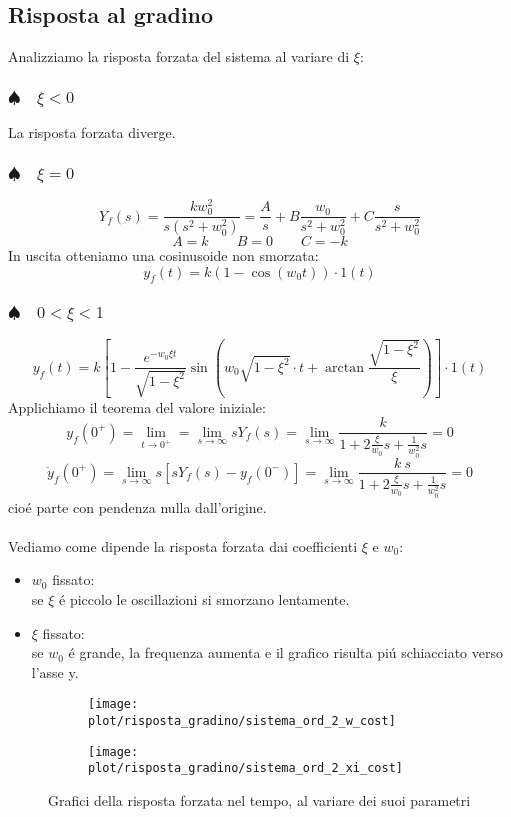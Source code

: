 \documentclass[../main.tex]{subfiles}
\begin{document}
	\subsection{Risposta al gradino}
	Analizziamo la risposta forzata del sistema al variare di $ \xi $:
	\subsubsection{$ \spadesuit \quad \xi < 0 $}
	La risposta forzata diverge.
	\subsubsection{$ \spadesuit \quad \xi = 0 $}
	\[ Y_f(s) = \frac{kw_0^2}{s(s^2+w_0^2)} = \frac{A}{s} + B\frac{w_0}{s^2+w_0^2} + C\frac{s}{s^2+w_0^2} \]
	\[ A = k \qquad B = 0 \qquad C = -k \]
	In uscita otteniamo una cosinusoide non smorzata:
	\[ y_f(t) = k(1-\cos(w_0t)) \cdot 1(t) \]
	\subsubsection{$ \spadesuit \quad 0 < \xi < 1 $}
	\[ y_f(t) = k \left[ 1 - \frac{e^{-w_0\xi t}}{\sqrt{1-\xi^2}} \sin\left( w_0 \sqrt{1-\xi^2} \cdot t + \arctan \frac{\sqrt{1-\xi^2}}{\xi} \right) \right] \cdot 1(t) \]
	Applichiamo il teorema del valore iniziale:
	\[ y_f(0^+) = \lim_{t \to 0^+} = \lim_{s \to \infty} s Y_f(s) = \lim_{s \to \infty} \frac{k}{1+2\frac{\xi}{w_0}s+\frac{1}{w_0^2}s} = 0 \]
	\[ \dot y_f(0^+) = \lim_{s \to \infty} s \left[ sY_f(s) - y_f(0^-) \right] = \lim_{s \to \infty} \frac{k\ s}{1+2\frac{\xi}{w_0}s+\frac{1}{w_0^2}s} = 0 \]
	cio\'e parte con pendenza nulla dall'origine.\\
	\smallskip\\
	Vediamo come dipende la risposta forzata dai coefficienti $ \xi $ e $ w_0 $:
	\begin{itemize}
		\item $ w_0 $ fissato:\\
		se $ \xi $ \'e piccolo le oscillazioni si smorzano lentamente.
		\item $ \xi $ fissato:\\
		se $ w_0 $ \'e grande, la frequenza aumenta e il grafico risulta pi\'u schiacciato verso l'asse y.
	\end{itemize} 
	\begin{figure}[h!]
		\centering
		\begin{subfigure}{0.5\textwidth}
			\texttt{[image: plot/risposta\_gradino/sistema\_ord\_2\_w\_cost]}
		\end{subfigure}%
		\begin{subfigure}{0.5\textwidth}
			\texttt{[image: plot/risposta\_gradino/sistema\_ord\_2\_xi\_cost]}
		\end{subfigure}
		\caption{Grafici della risposta forzata nel tempo, al variare dei suoi parametri}
	\end{figure}
\end{document}
